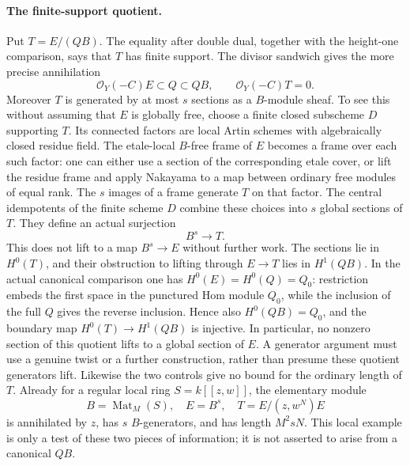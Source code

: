\paragraph{The finite-support quotient.}
Put $T=E/(QB)$.  The equality after double dual, together with the
height-one comparison, says that $T$ has finite support.  The divisor
sandwich gives the more precise annihilation
\[
              \mathcal O_Y(-C)E\subset Q\subset QB,
              \qquad \mathcal O_Y(-C)T=0.
\]
Moreover $T$ is generated by at most $s$ sections as a $B$-module
sheaf.  To see this without assuming that $E$ is globally free, choose
a finite closed subscheme $D$ supporting $T$.  Its connected factors
are local Artin schemes with algebraically closed residue field.  The
etale-local $B$-free frame of $E$ becomes a frame over each such factor:
one can either use a section of the corresponding etale cover, or
lift the residue frame and apply Nakayama to a map between ordinary
free modules of equal rank.  The $s$ images of a frame generate $T$
on that factor.  The central idempotents of the finite scheme $D$
combine these choices into $s$ global sections of $T$.  They define
an actual surjection
\[
                         B^s\longrightarrow T.
\]
This does not lift to a map $B^s\to E$ without further work.  The
sections lie in $H^0(T)$, and their obstruction to lifting through
$E\to T$ lies in $H^1(QB)$.  In the actual canonical comparison
one has $H^0(E)=H^0(Q)=Q_0$: restriction embeds the first space in
the punctured Hom module $Q_0$, while the inclusion of the full
$Q$ gives the reverse inclusion.  Hence also $H^0(QB)=Q_0$, and
the boundary map $H^0(T)\to H^1(QB)$ is injective.  In particular,
no nonzero section of this quotient lifts to a global section of
$E$.  A generator argument must use a genuine twist or a further
construction, rather than presume these quotient generators lift.
Likewise the two controls give no bound for the
ordinary length of $T$.  Already for a regular local ring
$S=k[[z,w]]$, the elementary module
\[
 B=\operatorname{Mat}_M(S),\quad E=B^s,\quad
 T=E/(z,w^N)E
\]
is annihilated by $z$, has $s$ $B$-generators, and has length
$M^2sN$.  This local example is only a test of these two pieces of
information; it is not asserted to arise from a canonical $QB$.

